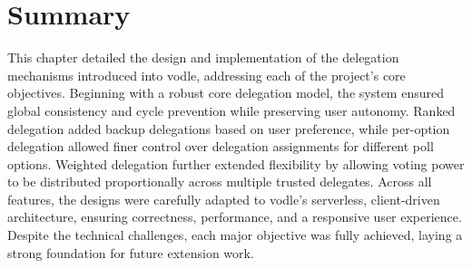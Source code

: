 
\section{Summary}

This chapter detailed the design and implementation of the delegation mechanisms introduced into vodle, addressing each of the project's core objectives. Beginning with a robust core delegation model, the system ensured global consistency and cycle prevention while preserving user autonomy. Ranked delegation added backup delegations based on user preference, while per-option delegation allowed finer control over delegation assignments for different poll options. Weighted delegation further extended flexibility by allowing voting power to be distributed proportionally across multiple trusted delegates. Across all features, the designs were carefully adapted to vodle's serverless, client-driven architecture, ensuring correctness, performance, and a responsive user experience. Despite the technical challenges, each major objective was fully achieved, laying a strong foundation for future extension work.
